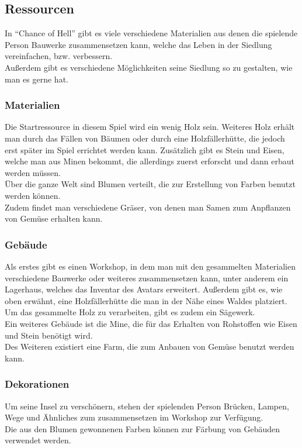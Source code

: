 \documentclass[paper=A4,pagesize=auto,12pt,headinclude=true,footinclude=true,BCOR=0mm,DIV=calc]{scrartcl}
\newcommand{\sectionspace}{
	\vspace{0.5cm}
}
\newcommand{\gametitle}{Chance of Hell}
\begin{document}


\sectionspace
\subsection{Ressourcen}\label{sec:Ressourcen}
In "`\gametitle"' gibt es viele verschiedene Materialien  aus denen die spielende Person Bauwerke zusammensetzen kann, welche das Leben in der Siedlung vereinfachen, bzw. verbessern.\\
Außerdem gibt es verschiedene Möglichkeiten seine Siedlung so zu gestalten, wie man es gerne hat. 

\subsubsection{Materialien}
Die Startressource in diesem Spiel wird ein wenig Holz sein. Weiteres Holz erhält man durch das Fällen von Bäumen oder durch eine Holzfällerhütte, die jedoch erst später im Spiel errichtet werden kann. Zusätzlich gibt es Stein und Eisen, welche man aus Minen bekommt, die allerdings zuerst erforscht und dann erbaut werden müssen.\\
Über die ganze Welt sind Blumen verteilt, die zur Erstellung von Farben benutzt werden können.\\
Zudem findet man verschiedene Gräser, von denen man Samen zum Anpflanzen von Gemüse erhalten kann. 

\subsubsection{Gebäude}
Als erstes gibt es einen Workshop, in dem man mit den gesammelten Materialien verschiedene Bauwerke oder weiteres zusammensetzen kann, unter anderem ein Lagerhaus, welches das Inventar des Avatars erweitert. Außerdem gibt es, wie oben erwähnt, eine Holzfällerhütte die man in der Nähe eines Waldes platziert. Um das gesammelte Holz zu verarbeiten, gibt es zudem ein Sägewerk.\\
Ein weiteres Gebäude ist die Mine, die für das Erhalten von Rohstoffen wie Eisen und Stein benötigt wird.\\
Des Weiteren existiert eine Farm, die zum Anbauen von Gemüse benutzt werden kann.

\subsubsection{Dekorationen}
Um seine Insel zu verschönern, stehen der spielenden Person Brücken, Lampen, Wege und Ähnliches zum zusammensetzen im Workshop zur Verfügung.\\
Die aus den Blumen gewonnenen Farben können zur Färbung von Gebäuden verwendet werden.
\end{document}
